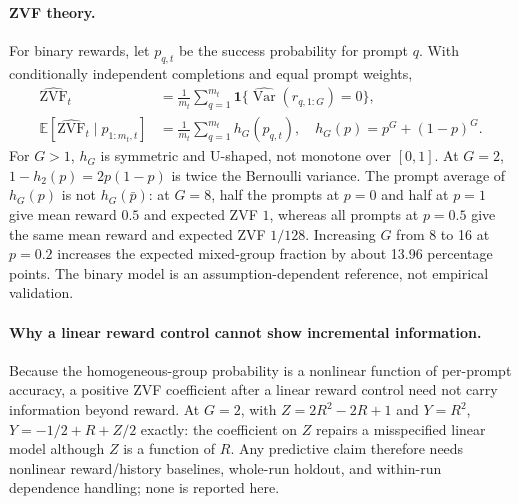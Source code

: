 \documentclass{article}
\begin{document}
\paragraph{ZVF theory.}
\label{sec:zvf-theory}
For binary rewards, let $p_{q,t}$ be the success probability for prompt $q$.
With conditionally independent completions and equal prompt weights,
\begin{align}
\widehat{\mathrm{ZVF}}_t &= \frac1{m_t}\sum_{q=1}^{m_t}
 \mathbf{1}\{\widehat{\operatorname{Var}}(r_{q,1:G})=0\},\\
\mathbb E[\widehat{\mathrm{ZVF}}_t\mid p_{1:m_t,t}]
 &=\frac1{m_t}\sum_{q=1}^{m_t}h_G(p_{q,t}),\quad
 h_G(p)=p^G+(1-p)^G.
\end{align}
For $G>1$, $h_G$ is symmetric and U-shaped, not monotone over $[0,1]$. At
$G=2$, $1-h_2(p)=2p(1-p)$ is twice the Bernoulli variance. The prompt average
of $h_G(p)$ is not $h_G(\bar p)$: at $G=8$, half the prompts at $p=0$ and half
at $p=1$ give mean reward $0.5$ and expected ZVF $1$, whereas all prompts at
$p=0.5$ give the same mean reward and expected ZVF $1/128$. Increasing $G$ from
8 to 16 at $p=0.2$ increases the expected mixed-group fraction by about 13.96
percentage points. The binary model is an assumption-dependent reference, not
empirical validation.

\paragraph{Why a linear reward control cannot show incremental information.}
Because the homogeneous-group probability is a nonlinear function of per-prompt
accuracy, a positive ZVF coefficient after a linear reward control need not
carry information beyond reward. At $G=2$, with $Z=2R^2-2R+1$ and $Y=R^2$,
$Y=-1/2+R+Z/2$ exactly: the coefficient on $Z$ repairs a misspecified linear
model although $Z$ is a function of $R$. Any predictive claim therefore needs
nonlinear reward/history baselines, whole-run holdout, and within-run dependence
handling; none is reported here.

\end{document}
